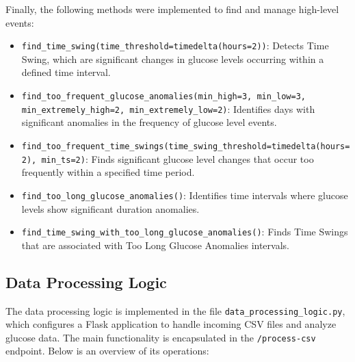 \documentclass{article}
\begin{document}
Finally, the following methods were implemented to find and manage high-level events:
\begin{itemize}
     \item \texttt{find\_time\_swing(time\_threshold=timedelta(hours=2))}: Detects Time Swing, which are significant changes in glucose levels occurring within a defined time interval.
    \item \texttt{find\_too\_frequent\_glucose\_anomalies(min\_high=3, min\_low=3, min\_extremely\_high=2, min\_extremely\_low=2)}: Identifies days with significant anomalies in the frequency of glucose level events.
    \item \texttt{find\_too\_frequent\_time\_swings(time\_swing\_threshold=timedelta(hours=2), min\_ts=2)}: Finds significant glucose level changes that occur too frequently within a specified time period.
    \item \texttt{find\_too\_long\_glucose\_anomalies()}: Identifies time intervals where glucose levels show significant duration anomalies.
    \item \texttt{find\_time\_swing\_with\_too\_long\_glucose\_anomalies()}: Finds Time Swings that are associated with Too Long Glucose Anomalies intervals.
\end{itemize}

\subsection{Data Processing Logic}

The data processing logic is implemented in the file \texttt{data\_processing\_logic.py}, which configures a Flask application to handle incoming CSV files and analyze glucose data. The main functionality is encapsulated in the \texttt{/process-csv} endpoint. Below is an overview of its operations:
\end{document}
